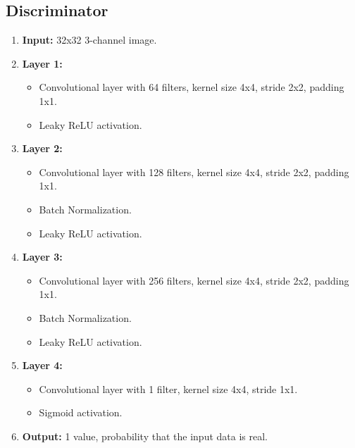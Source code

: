 \subsection*{Discriminator}
\begin{enumerate}
    \item \textbf{Input:} 32x32 3-channel image.
    \item \textbf{Layer 1:} 
    \begin{itemize}
        \item Convolutional layer with 64 filters, kernel size 4x4, stride 2x2, padding 1x1.
        \item Leaky ReLU activation.
    \end{itemize}
    \item \textbf{Layer 2:} 
    \begin{itemize}
        \item Convolutional layer with 128 filters, kernel size 4x4, stride 2x2, padding 1x1.
        \item Batch Normalization.
        \item Leaky ReLU activation.
    \end{itemize}
    \item \textbf{Layer 3:} 
    \begin{itemize}
        \item Convolutional layer with 256 filters, kernel size 4x4, stride 2x2, padding 1x1.
        \item Batch Normalization.
        \item Leaky ReLU activation.
    \end{itemize}
    \item \textbf{Layer 4:} 
    \begin{itemize}
        \item Convolutional layer with 1 filter, kernel size 4x4, stride 1x1.
        \item Sigmoid activation.
    \end{itemize}
    \item \textbf{Output:} 1 value, probability that the input data is real.
\end{enumerate}

